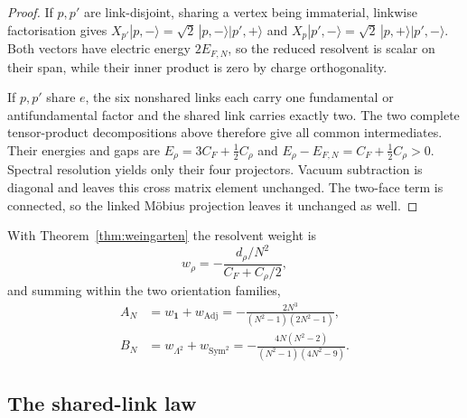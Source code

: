 \documentclass[11pt]{article}
\theoremstyle{plain}
\theoremstyle{definition}
\theoremstyle{remark}
\newcommand{\chk}[1]{}
\newcommand{\CF}{C_F}
\begin{document}
\begin{proof}
If $p,p'$ are link-disjoint, sharing a vertex being immaterial, linkwise
factorisation gives
$X_{p'}|p,-\rangle=\sqrt2\,|p,-\rangle|p',+\rangle$ and
$X_p|p',-\rangle=\sqrt2\,|p,+\rangle|p',-\rangle$. Both vectors have electric
energy $2E_{F,N}$, so the reduced resolvent is scalar on their span, while
their inner product is zero by charge orthogonality.

If $p,p'$ share $e$, the six nonshared links each carry one fundamental or
antifundamental factor and the shared link carries exactly two. The two
complete tensor-product decompositions above therefore give all common
intermediates. Their energies and gaps are
$E_\rho=3\CF+\tfrac12C_\rho$ and
$E_\rho-E_{F,N}=\CF+\tfrac12C_\rho>0$. Spectral resolution yields only their
four projectors. Vacuum subtraction is diagonal and leaves this cross matrix
element unchanged. The two-face term is connected, so the linked M\"obius
projection leaves it unchanged as well.
\end{proof}
\chk{connected first order vanishes by inclusion-exclusion, not by cancellation of numbers}

With Theorem~\ref{thm:weingarten} the resolvent weight is
\begin{equation}\label{eq:w}
  w_\rho=-\frac{d_\rho/N^2}{\CF+C_\rho/2},
\end{equation}
and summing within the two orientation families,
\begin{align}
  A_N&=w_{\mathbf 1}+w_{\mathrm{Adj}}=-\frac{2N^3}{(N^2-1)(2N^2-1)},\label{eq:AN}\\
  B_N&=w_{\Lambda^2}+w_{\mathrm{Sym}^2}=-\frac{4N(N^2-2)}{(N^2-1)(4N^2-9)}.\label{eq:BN}
\end{align}
\chk{the four channel weights follow from dimension and Casimir}
\chk{A\_N and B\_N are the channel sums, not transcriptions}

\subsection{The shared-link law}
\end{document}
